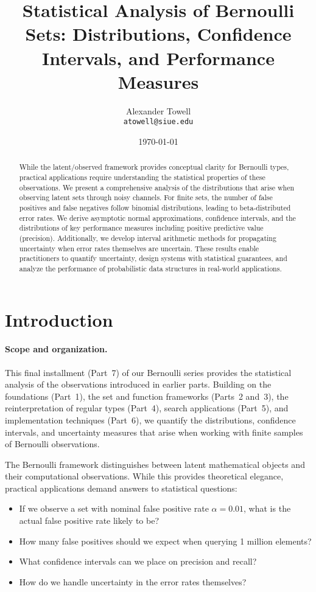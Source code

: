 \documentclass[11pt,final,hidelinks]{article}
\title{Statistical Analysis of Bernoulli Sets: Distributions, Confidence Intervals, and Performance Measures}
\author{
    Alexander Towell\\
    \texttt{atowell@siue.edu}
}
\date{\today}
\newcommand{\fprate}{\alpha}
\begin{document}
\maketitle
\NotationSection

\begin{abstract}
While the latent/observed framework provides conceptual clarity for Bernoulli types, practical applications require understanding the statistical properties of these observations. We present a comprehensive analysis of the distributions that arise when observing latent sets through noisy channels. For finite sets, the number of false positives and false negatives follow binomial distributions, leading to beta-distributed error rates. We derive asymptotic normal approximations, confidence intervals, and the distributions of key performance measures including positive predictive value (precision). Additionally, we develop interval arithmetic methods for propagating uncertainty when error rates themselves are uncertain. These results enable practitioners to quantify uncertainty, design systems with statistical guarantees, and analyze the performance of probabilistic data structures in real-world applications.
\end{abstract}

\section{Introduction}

\paragraph{Scope and organization.}  This final installment (Part~7) of our Bernoulli series provides the statistical analysis of the observations introduced in earlier parts.  Building on the foundations (Part~1), the set and function frameworks (Parts~2 and~3), the reinterpretation of regular types (Part~4), search applications (Part~5), and implementation techniques (Part~6), we quantify the distributions, confidence intervals, and uncertainty measures that arise when working with finite samples of Bernoulli observations.

The Bernoulli framework distinguishes between latent mathematical objects and their computational observations. While this provides theoretical elegance, practical applications demand answers to statistical questions:
\begin{itemize}
    \item If we observe a set with nominal false positive rate $\fprate = 0.01$, what is the actual false positive rate likely to be?
    \item How many false positives should we expect when querying 1 million elements?
    \item What confidence intervals can we place on precision and recall?
    \item How do we handle uncertainty in the error rates themselves?
\end{itemize}
\end{document}

